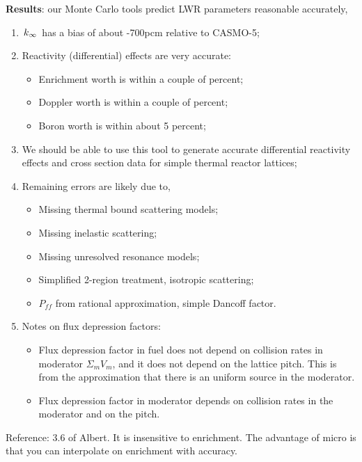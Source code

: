 \documentclass{school-22.211-notes}
\begin{document}
\textbf{Results}: our Monte Carlo tools predict LWR parameters reasonable accurately,
\begin{enumerate}
\item $\left. k_{\infty} \right.$ has a bias of about -700pcm relative to CASMO-5;
\item Reactivity (differential) effects are very accurate:
  \begin{itemize}
  \item Enrichment worth is within a couple of percent;
  \item Doppler worth is within a couple of percent;
  \item Boron worth is within about 5 percent;
  \end{itemize}
\item We should be able to use this tool to generate accurate differential reactivity effects and cross section data for simple thermal reactor lattices;
\item Remaining errors are likely due to,
  \begin{itemize}
    \item Missing thermal bound scattering models;
    \item Missing inelastic scattering;
    \item Missing unresolved resonance models;
    \item Simplified 2-region treatment, isotropic scattering;
    \item $P_{ff}$ from rational approximation, simple Dancoff factor. 
  \end{itemize}

\item Notes on flux depression factors: 
  \begin{itemize}
  \item Flux depression factor in fuel does not depend on collision rates in moderator $\Sigma_m V_m$, and it does not depend on the lattice pitch. This is from the approximation that there is an uniform source in the moderator. 

  \item Flux depression factor in moderator depends on collision rates in the moderator and on the pitch. 
  \end{itemize}
\end{enumerate}
Reference: 3.6 of Albert.  It is insensitive to enrichment. The advantage of micro is that you can interpolate on enrichment with accuracy. 
\end{document}
